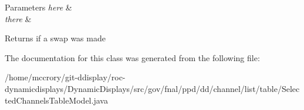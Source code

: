\begin{DoxyParams}{Parameters}
{\em here} & \\
\hline
{\em there} & \\
\hline
\end{DoxyParams}
\begin{DoxyReturn}{Returns}
if a swap was made 
\end{DoxyReturn}


The documentation for this class was generated from the following file\-:\begin{DoxyCompactItemize}
\item 
/home/mccrory/git-\/ddisplay/roc-\/dynamicdisplays/\-Dynamic\-Displays/src/gov/fnal/ppd/dd/channel/list/table/Selected\-Channels\-Table\-Model.\-java\end{DoxyCompactItemize}
